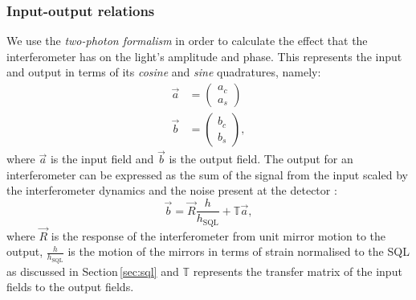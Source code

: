 \subsubsection{Input-output relations}
We use the \emph{two-photon formalism} \cite{Caves1985, Schumaker1985} in order to calculate the effect that the interferometer has on the light's amplitude and phase. This represents the input and output in terms of its \emph{cosine} and \emph{sine} quadratures, namely:
\begin{align}
  \vec{a} &=
  \begin{pmatrix}
    a_c \\
    a_s
  \end{pmatrix} \\
  \vec{b} &=
  \begin{pmatrix}
    b_c \\
    b_s
  \end{pmatrix},
\end{align}
where $\vec{a}$ is the input field and $\vec{b}$ is the output field. The output for an interferometer can be expressed as the sum of the signal from the input scaled by the interferometer dynamics and the noise present at the detector \cite{Danilishin2015}:
\begin{equation}
  \label{eq:ifo-output-signal}
  \vec{b} = \vec{R} \frac{h}{h_{\text{SQL}}} + \mathbb{T} \vec{a},
\end{equation}
where $\vec{R}$ is the response of the interferometer from unit mirror motion to the output, $\frac{h}{h_{\text{SQL}}}$ is the motion of the mirrors in terms of strain normalised to the \gls{SQL} as discussed in Section\,\ref{sec:sql} and $\mathbb{T}$ represents the transfer matrix of the input fields to the output fields.

